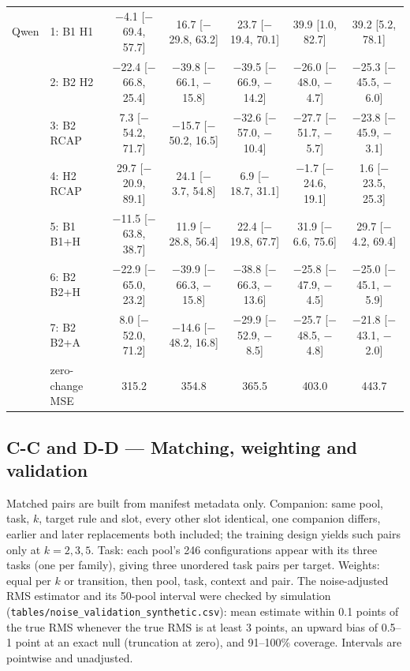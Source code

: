 \begin{table}[h]
{\begin{tabular}{llccccc}
\midrule
Qwen & 1: B1 \cto{} H1 & $-$4.1 [$-$69.4, 57.7] & 16.7 [$-$29.8, 63.2] & 23.7 [$-$19.4, 70.1] & 39.9 [1.0, 82.7] & 39.2 [5.2, 78.1] \\
 & 2: B2 \cto{} H2 & $-$22.4 [$-$66.8, 25.4] & $-$39.8 [$-$66.1, $-$15.8] & $-$39.5 [$-$66.9, $-$14.2] & $-$26.0 [$-$48.0, $-$4.7] & $-$25.3 [$-$45.5, $-$6.0] \\
 & 3: B2 \cto{} RCAP & 7.3 [$-$54.2, 71.7] & $-$15.7 [$-$50.2, 16.5] & $-$32.6 [$-$57.0, $-$10.4] & $-$27.7 [$-$51.7, $-$5.7] & $-$23.8 [$-$45.9, $-$3.1] \\
 & 4: H2 \cto{} RCAP & 29.7 [$-$20.9, 89.1] & 24.1 [$-$3.7, 54.8] & 6.9 [$-$18.7, 31.1] & $-$1.7 [$-$24.6, 19.1] & 1.6 [$-$23.5, 25.3] \\
 & 5: B1 \cto{} B1+H & $-$11.5 [$-$63.8, 38.7] & 11.9 [$-$28.8, 56.4] & 22.4 [$-$19.8, 67.7] & 31.9 [$-$6.6, 75.6] & 29.7 [$-$4.2, 69.4] \\
 & 6: B2 \cto{} B2+H & $-$22.9 [$-$65.0, 23.2] & $-$39.9 [$-$66.3, $-$15.8] & $-$38.8 [$-$66.3, $-$13.6] & $-$25.8 [$-$47.9, $-$4.5] & $-$25.0 [$-$45.1, $-$5.9] \\
 & 7: B2 \cto{} B2+A & 8.0 [$-$52.0, 71.2] & $-$14.6 [$-$48.2, 16.8] & $-$29.9 [$-$52.9, $-$8.5] & $-$25.7 [$-$48.5, $-$4.8] & $-$21.8 [$-$43.1, $-$2.0] \\
 & zero-change MSE & 315.2 & 354.8 & 365.5 & 403.0 & 443.7 \\
\bottomrule
\end{tabular}
}
\end{table}

\subsection*{C-C and D-D --- Matching, weighting and validation}
Matched pairs are built from manifest metadata only. Companion: same pool, task, $k$, target rule and slot, every other slot identical, one companion differs, earlier and later replacements both included; the training design yields such pairs only at $k=2,3,5$. Task: each pool's 246 configurations appear with its three tasks (one per family), giving three unordered task pairs per target. Weights: equal per $k$ or transition, then pool, task, context and pair. The noise-adjusted RMS estimator and its 50-pool interval were checked by simulation (\texttt{tables/noise\_validation\_synthetic.csv}): mean estimate within 0.1 points of the true RMS whenever the true RMS is at least 3 points, an upward bias of 0.5--1 point at an exact null (truncation at zero), and 91--100\% coverage. Intervals are pointwise and unadjusted.

